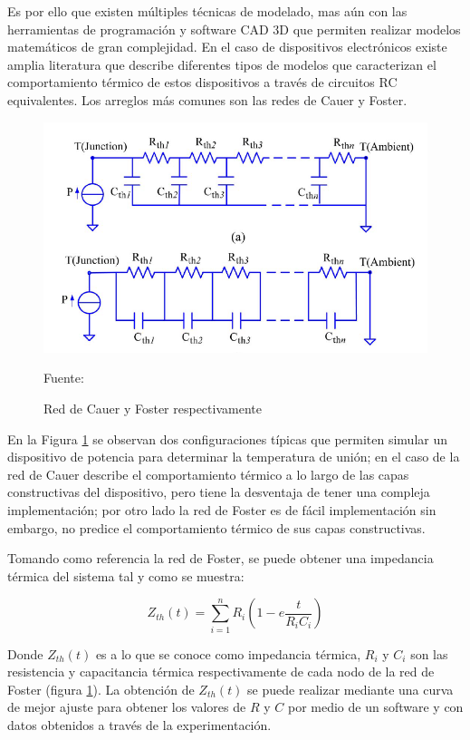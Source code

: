Es por ello que existen múltiples técnicas de modelado, mas aún con las herramientas de programación y software CAD 3D que permiten realizar modelos matemáticos de gran complejidad. En el caso de dispositivos electrónicos existe amplia literatura que describe diferentes tipos de modelos que caracterizan el comportamiento térmico de estos dispositivos a través de circuitos RC equivalentes. Los arreglos más comunes son las redes de Cauer y Foster. \cite{realtime}

\begin{figure}[H]
\centering
\includegraphics[scale=0.65]{Figuras/foster.png}
\caption{Red de Cauer y Foster respectivamente}
Fuente: \cite{realtime}
\label{foster}
\end{figure}

En la Figura \ref{foster} se observan dos configuraciones típicas que permiten simular un dispositivo de potencia  para determinar la temperatura de unión; en el caso de la red de Cauer describe el comportamiento térmico a lo largo de las capas constructivas del dispositivo, pero tiene la desventaja de tener una compleja implementación; por otro lado la red de Foster es de fácil implementación sin embargo, no predice el comportamiento térmico de sus capas constructivas. \cite{realtime}

Tomando como referencia la red de Foster, se puede obtener una impedancia térmica del sistema tal y como se muestra:

\begin{equation}\label{2}
    Z_{th}(t)=\sum ^{n}_{i=1}R_{i}\left ( 1-e\frac{t}{R_{i}C_{i}} \right )
\end{equation}

Donde $Z_{th}(t)$ es a lo que se conoce como  impedancia térmica, $R_{i}$ y $C_{i}$ son las resistencia y capacitancia térmica respectivamente de cada nodo de la red de Foster (figura \ref{foster}). La obtención de $Z_{th}(t)$ se puede realizar mediante una curva de mejor ajuste para obtener los valores de  $R$ y $C$  por medio de un software y con datos obtenidos a través de la experimentación. \cite{alfaro} 

